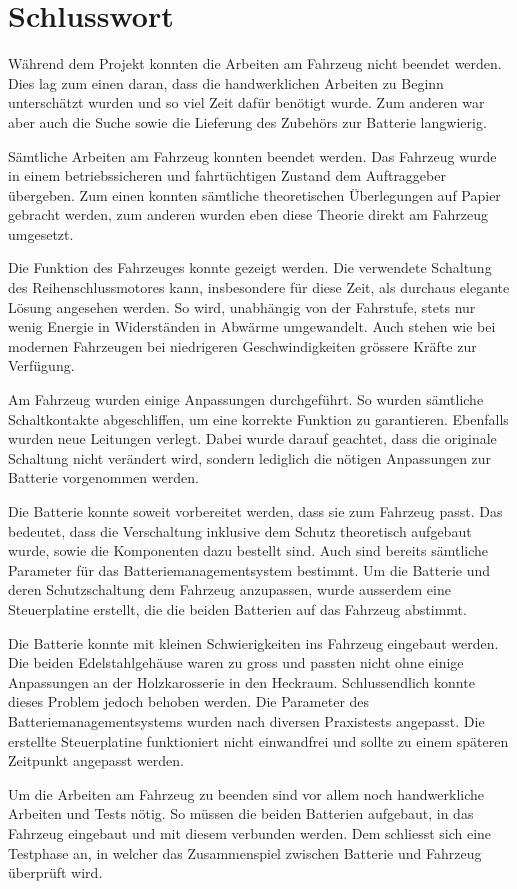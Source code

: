 \chapter{Schlusswort}
\color{red}
Während dem Projekt konnten die Arbeiten am Fahrzeug nicht beendet werden. Dies lag zum einen daran, dass die handwerklichen Arbeiten zu Beginn unterschätzt wurden und so viel Zeit dafür benötigt wurde. Zum anderen war aber auch die Suche sowie die Lieferung des Zubehörs zur Batterie langwierig.
\color{black}

\color{blue}
Sämtliche Arbeiten am Fahrzeug konnten beendet werden. Das Fahrzeug wurde in einem betriebssicheren und fahrtüchtigen Zustand dem Auftraggeber übergeben. Zum einen konnten sämtliche theoretischen Überlegungen auf Papier gebracht werden, zum anderen wurden eben diese Theorie direkt am Fahrzeug umgesetzt.
\color{black}

Die Funktion des Fahrzeuges konnte gezeigt werden. Die verwendete Schaltung des Reihenschlussmotores kann, insbesondere für diese Zeit, als durchaus elegante Lösung angesehen werden. So wird, unabhängig von der Fahrstufe, stets nur wenig Energie in Widerständen in Abwärme umgewandelt. Auch stehen wie bei modernen Fahrzeugen bei niedrigeren Geschwindigkeiten grössere Kräfte zur Verfügung.

Am Fahrzeug wurden einige Anpassungen durchgeführt. So wurden sämtliche Schaltkontakte abgeschliffen, um eine korrekte Funktion zu garantieren. Ebenfalls wurden neue Leitungen verlegt. Dabei wurde darauf geachtet, dass die originale Schaltung nicht verändert wird, sondern lediglich die nötigen Anpassungen zur Batterie vorgenommen werden.

\color{red}
Die Batterie konnte soweit vorbereitet werden, dass sie zum Fahrzeug passt. Das bedeutet, dass die Verschaltung inklusive dem Schutz theoretisch aufgebaut wurde, sowie die Komponenten dazu bestellt sind. Auch sind bereits sämtliche Parameter für das Batteriemanagementsystem bestimmt. Um die Batterie und deren Schutzschaltung dem Fahrzeug anzupassen, wurde ausserdem eine Steuerplatine erstellt, die die beiden Batterien auf das Fahrzeug abstimmt.

\color{blue}
Die Batterie konnte mit kleinen Schwierigkeiten ins Fahrzeug eingebaut werden. Die beiden Edelstahlgehäuse waren zu gross und passten nicht ohne einige Anpassungen an der Holzkarosserie in den Heckraum. Schlussendlich konnte dieses Problem jedoch behoben werden. Die Parameter des Batteriemanagementsystems wurden nach diversen Praxistests angepasst. Die erstellte Steuerplatine funktioniert nicht einwandfrei und sollte zu einem späteren Zeitpunkt angepasst werden.

\color{red}
Um die Arbeiten am Fahrzeug zu beenden sind vor allem noch handwerkliche Arbeiten und Tests nötig. So müssen die beiden Batterien aufgebaut, in das Fahrzeug eingebaut und mit diesem verbunden werden. Dem schliesst sich eine Testphase an, in welcher das Zusammenspiel zwischen Batterie und Fahrzeug überprüft wird.
\color{black}